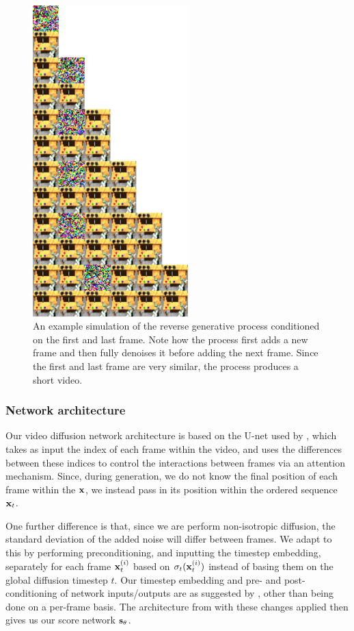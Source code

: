 \begin{figure}
    \centering
    \includegraphics[width=6cm]{figs/tddm/short-obs-32.png}
    \caption{An example simulation of the reverse generative process conditioned on the first and last frame. Note how the process first adds a new frame and then fully denoises it before adding the next frame. Since the first and last frame are very similar, the process produces a short video.}
    \label{fig:tddm-examplevideoreverse}
\end{figure}




\subsubsection{Network architecture}
Our video diffusion network architecture is based on the U-net used by \citet{harvey2022flexible}, which takes as input the index of each frame within the video, and uses the differences between these indices to control the interactions between frames via an attention mechanism. Since, during generation, we do not know the final position of each frame within the ${\mathbf{x}}$, we instead pass in its position within the ordered sequence ${\mathbf{x}}_t$.

One further difference is that, since we are perform non-isotropic diffusion, the standard deviation of the added noise will differ between frames. We adapt to this by performing preconditioning, and inputting the timestep embedding, separately for each frame ${\mathbf{x}}_t^{(i)}$ based on $\sigma_t({\mathbf{x}}_t^{(i)})$ instead of basing them on the global diffusion timestep $t$. Our timestep embedding and pre- and post-conditioning of network inputs/outputs are as suggested by \citet{karras2022elucidating}, other than being done on a per-frame basis. The architecture from \citet{harvey2022flexible} with these changes applied then gives us our score network ${\mathbf{s}}_\theta$.

